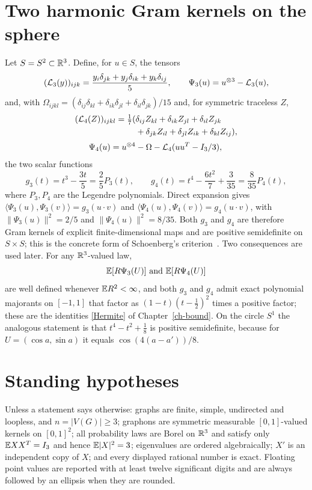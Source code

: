 \section{Two harmonic Gram kernels on the sphere}\label{sec-harmonics}
Let $S=S^2\subset\mathbb R^3$. Define, for $u\in S$, the tensors
\[
 ({\cal L}_3(y))_{ijk}=\frac{y_i\delta_{jk}+y_j\delta_{ik}+y_k\delta_{ij}}5,
 \qquad
 \Psi_3(u)=u^{\otimes3}-{\cal L}_3(u),
\]
and, with
$\Omega_{ijkl}=(\delta_{ij}\delta_{kl}+\delta_{ik}\delta_{jl}
+\delta_{il}\delta_{jk})/15$ and, for symmetric traceless $Z$,
\[
 \begin{aligned}
 ({\cal L}_4(Z))_{ijkl}=\tfrac17(&\delta_{ij}Z_{kl}+\delta_{ik}Z_{jl}
   +\delta_{il}Z_{jk}\\
  &+\delta_{jk}Z_{il}+\delta_{jl}Z_{ik}+\delta_{kl}Z_{ij}),\\[2pt]
 \Psi_4(u)=u^{\otimes4}&-\Omega-{\cal L}_4(uu^T-I_3/3),
 \end{aligned}
\]
the two scalar functions
\begin{equation}\label{g34}
 g_3(t)=t^3-\frac{3t}5=\frac25P_3(t),
 \qquad
 g_4(t)=t^4-\frac{6t^2}7+\frac3{35}=\frac8{35}P_4(t),
\end{equation}
where $P_3,P_4$ are the Legendre polynomials. Direct expansion gives
$\langle\Psi_3(u),\Psi_3(v)\rangle=g_3(u\cdot v)$ and
$\langle\Psi_4(u),\Psi_4(v)\rangle=g_4(u\cdot v)$, with
$\|\Psi_3(u)\|^2=2/5$ and $\|\Psi_4(u)\|^2=8/35$. Both $g_3$ and $g_4$ are
therefore Gram kernels of explicit finite-dimensional maps and are positive
semidefinite on $S\times S$; this is the concrete form of Schoenberg's
criterion~\cite{Schoenberg}. Two consequences are used later. For any $\mathbb R^3$-valued law,
\[
 \E[R\Psi_3(U)]\ \text{and}\ \E[R\Psi_4(U)]
\]
are well defined whenever $\mathbb E R^2<\infty$, and both $g_3$ and $g_4$ admit
exact polynomial majorants on $[-1,1]$ that factor as
$(1-t)(t-\tfrac12)^2$ times a positive factor; these are the identities
\eqref{Hermite} of Chapter~\ref{ch-bound}. On the circle $S^1$ the analogous
statement is that $t^4-t^2+\tfrac18$ is positive semidefinite, because for
$U=(\cos a,\sin a)$ it equals $\cos(4(a-a'))/8$.

\section{Standing hypotheses}\label{sec-standing}
Unless a statement says otherwise: graphs are finite, simple, undirected and
loopless, and $n=|V(G)|\ge3$; graphons are symmetric measurable
$[0,1]$-valued kernels on $[0,1]^2$; all probability laws are Borel on $\mathbb R^3$
and satisfy only $\mathbb E XX^T=I_3$ and hence $\mathbb E|X|^2=3$; eigenvalues are ordered
algebraically; $X'$ is an independent copy of $X$; and every displayed
rational number is exact. Floating point values are reported with at least
twelve significant digits and are always followed by an ellipsis when they are
rounded.
